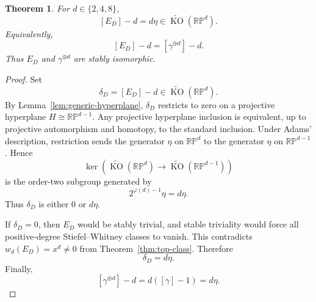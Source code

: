 \documentclass[10pt,a4paper]{amsart}
\newtheorem{theorem}{Theorem}
\newcommand{\KO}{\operatorname{KO}}
\newcommand{\RP}{\mathbb{RP}}
\begin{document}
\begin{theorem}
	\label{thm:ko-class}
	For $d\in\{2,4,8\}$,
	\[
	[E_D]-d=d\eta
	\in\widetilde{\KO}(\RP^d).
	\]
	Equivalently,
	\[
	[E_D]-d=[\gamma^{\oplus d}]-d.
	\]
	Thus $E_D$ and $\gamma^{\oplus d}$ are stably isomorphic.
\end{theorem}

\begin{proof}
	Set
	\[
	\delta_D=[E_D]-d\in\widetilde{\KO}(\RP^d).
	\]
	By Lemma~\ref{lem:generic-hyperplane}, $\delta_D$ restricts to zero on
	a projective hyperplane $H\cong\RP^{d-1}$. Any projective hyperplane
	inclusion is equivalent, up to projective automorphism and homotopy, to
	the standard inclusion. Under Adams' description, restriction sends
	the generator $\eta$ on $\RP^d$ to the generator $\eta$ on
	$\RP^{d-1}$. Hence
	\[
	\ker\!\left(
	\widetilde{\KO}(\RP^d)
	\longrightarrow
	\widetilde{\KO}(\RP^{d-1})
	\right)
	\]
	is the order-two subgroup generated by
	\[
	2^{\varphi(d)-1}\eta=d\eta.
	\]
	Thus $\delta_D$ is either $0$ or $d\eta$.
	
	If $\delta_D=0$, then $E_D$ would be stably trivial, and stable
	triviality would force all positive-degree Stiefel--Whitney classes to
	vanish. This contradicts
	$w_d(E_D)=x^d\ne0$ from Theorem~\ref{thm:top-class}. Therefore
	\[
	\delta_D=d\eta.
	\]
	Finally,
	\[
	[\gamma^{\oplus d}]-d=d([\gamma]-1)=d\eta.
	\]
\end{proof}
\end{document}
